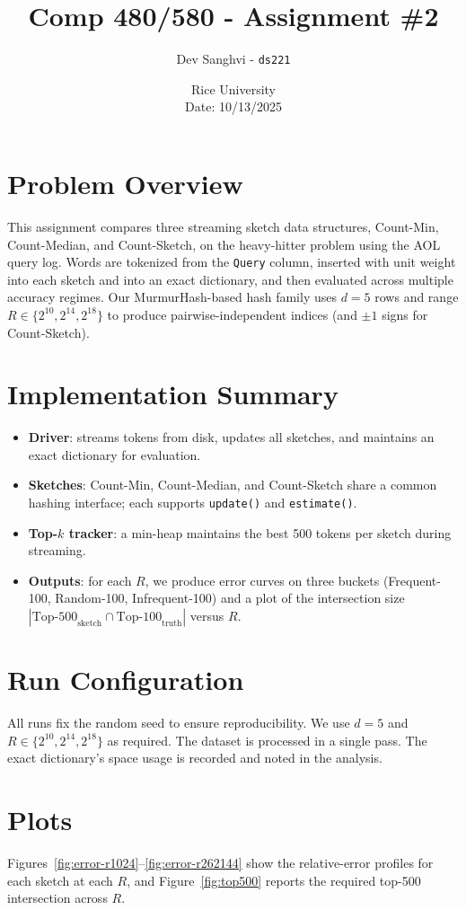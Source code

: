 \documentclass[11pt]{article}
\title{Comp 480/580 - Assignment \#2}
\author{Dev Sanghvi - \texttt{ds221}}
\date{Rice University \\ Date: 10/13/2025}
\begin{document}
\maketitle

\section*{Problem Overview}
This assignment compares three streaming sketch data structures, Count-Min, Count-Median, and Count-Sketch, on the heavy-hitter problem using the AOL query log. Words are tokenized from the \texttt{Query} column, inserted with unit weight into each sketch and into an exact dictionary, and then evaluated across multiple accuracy regimes. Our MurmurHash-based hash family uses $d=5$ rows and range $R\in\{2^{10},2^{14},2^{18}\}$ to produce pairwise-independent indices (and $\pm1$ signs for Count-Sketch).

\section{Implementation Summary}
\begin{itemize}
  \item \textbf{Driver}: streams tokens from disk, updates all sketches, and maintains an exact dictionary for evaluation.
  \item \textbf{Sketches}: Count-Min, Count-Median, and Count-Sketch share a common hashing interface; each supports \texttt{update()} and \texttt{estimate()}.
  \item \textbf{Top-$k$ tracker}: a min-heap maintains the best 500 tokens per sketch during streaming.
  \item \textbf{Outputs}: for each $R$, we produce error curves on three buckets (Frequent-100, Random-100, Infrequent-100) and a plot of the intersection size $|\text{Top-500}_\text{sketch}\cap\text{Top-100}_\text{truth}|$ versus $R$.
\end{itemize}

\section{Run Configuration}
All runs fix the random seed to ensure reproducibility. We use $d=5$ and $R\in\{2^{10},2^{14},2^{18}\}$ as required. The dataset is processed in a single pass. The exact dictionary's space usage is recorded and noted in the analysis.

\section{Plots}
Figures~\ref{fig:error-r1024}--\ref{fig:error-r262144} show the relative-error profiles for each sketch at each $R$, and Figure~\ref{fig:top500} reports the required top-500 intersection across $R$.
\end{document}
